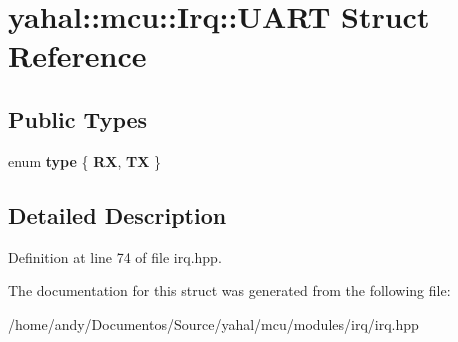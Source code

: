\hypertarget{structyahal_1_1mcu_1_1_irq_1_1_u_a_r_t}{}\section{yahal\+:\+:mcu\+:\+:Irq\+:\+:U\+A\+R\+T Struct Reference}
\label{structyahal_1_1mcu_1_1_irq_1_1_u_a_r_t}
\subsection*{Public Types}
\begin{DoxyCompactItemize}
\item 
\hypertarget{structyahal_1_1mcu_1_1_irq_1_1_u_a_r_t_abaaf771ad4cd5f21a9177b95455dbc40}{}enum {\bfseries type} \{ {\bfseries R\+X}, 
{\bfseries T\+X}
 \}\label{structyahal_1_1mcu_1_1_irq_1_1_u_a_r_t_abaaf771ad4cd5f21a9177b95455dbc40}

\end{DoxyCompactItemize}


\subsection{Detailed Description}


Definition at line 74 of file irq.\+hpp.



The documentation for this struct was generated from the following file\+:\begin{DoxyCompactItemize}
\item 
/home/andy/\+Documentos/\+Source/yahal/mcu/modules/irq/irq.\+hpp\end{DoxyCompactItemize}
